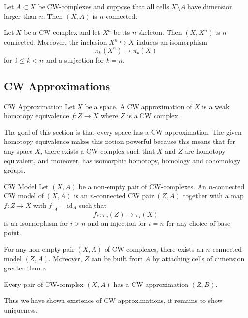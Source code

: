 \documentclass[a4paper]{article}
\begin{document}
\begin{crl}{}{} Let $A\subset X$ be CW-complexes and suppose that all cells $X\setminus A$ have dimension larger than $n$. Then $(X,A)$ is $n$-connected. 
\end{crl}

\begin{crl}{}{} Let $X$ be a CW complex and let $X^n$ be its $n$-skeleton. Then $(X,X^n)$ is $n$-connected. Moreover, the inclusion $X^n\hookrightarrow X$ induces an isomorphism $$\pi_k(X^n)\to\pi_k(X)$$ for $0\leq k<n$ and a surjection for $k=n$. 
\end{crl}

\subsection{CW Approximations}
\begin{defn}{CW Approximation}{} Let $X$ be a space. A CW approximation of $X$ is a weak homotopy equivalence $f:Z\to X$ where $Z$ is a CW complex. 
\end{defn}

The goal of this section is that every space has a CW approximation. The given homotopy equivalence makes this notion powerful because this means that for any space $X$, there exists a CW-complex such that $X$ and $Z$ are homotopy equivalent, and moreover, has isomorphic homotopy, homology and cohomology groups. 

\begin{defn}{CW Model}{} Let $(X,A)$ be a non-empty pair of CW-complexes. An $n$-connected CW model of $(X,A)$ is an $n$-connected CW pair $(Z,A)$ together with a map $f:Z\to X$ with $f|_A=\text{id}_A$ such that $$f_\ast:\pi_i(Z)\to\pi_i(X)$$ is an isomorphism for $i>n$ and an injection for $i=n$ for any choice of base point. 
\end{defn}

\begin{thm}{}{} For any non-empty pair $(X,A)$ of CW-complexes, there exists an $n$-connected model $(Z,A)$. Moreover, $Z$ can be built from $A$ by attaching cells of dimension greater than $n$. 
\end{thm}

\begin{crl}{}{} Every pair of CW-complex $(X,A)$ has a CW approximation $(Z,B)$. 
\end{crl}

Thus we have shown existence of CW approximations, it remains to show uniqueness. 
\end{document}
